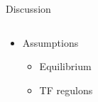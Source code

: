 \begin{frame}{Discussion}
\begin{columns}
\begin{column}{0.5\textwidth}
\begin{itemize}
\begin{itemize}
    \end{itemize}
    \item<3| handout:3> Assumptions
    \begin{itemize}
        \item Equilibrium
        \item TF regulons


\end{itemize}
\end{itemize}
\end{column}
\end{columns}
\end{frame}
